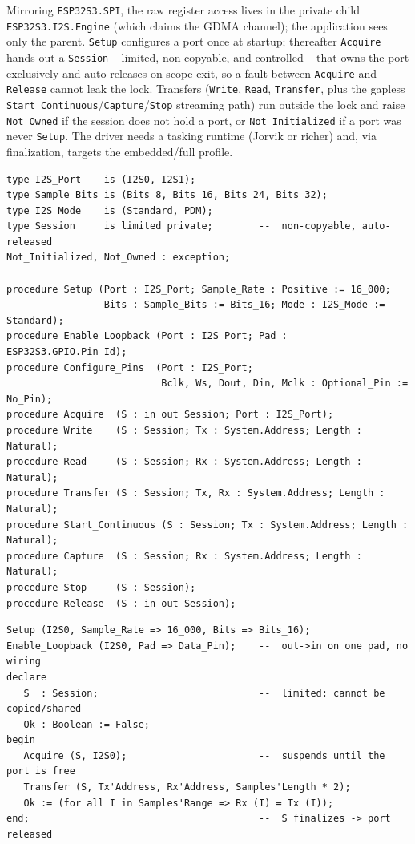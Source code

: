Mirroring \texttt{ESP32S3.SPI}, the raw register access lives in the private child
\texttt{ESP32S3.I2S.Engine} (which claims the GDMA channel); the application sees
only the parent. \texttt{Setup} configures a port once at startup; thereafter
\texttt{Acquire} hands out a \texttt{Session} -- limited, non-copyable, and
controlled -- that owns the port exclusively and auto-releases on scope exit, so a
fault between \texttt{Acquire} and \texttt{Release} cannot leak the lock.
Transfers (\texttt{Write}, \texttt{Read}, \texttt{Transfer}, plus the gapless
\texttt{Start\_Continuous}/\texttt{Capture}/\texttt{Stop} streaming path) run
outside the lock and raise \texttt{Not\_Owned} if the session does not hold a
port, or \texttt{Not\_Initialized} if a port was never \texttt{Setup}. The driver
needs a tasking runtime (Jorvik or richer) and, via finalization, targets the
embedded/full profile.

\begin{lstlisting}
type I2S_Port    is (I2S0, I2S1);
type Sample_Bits is (Bits_8, Bits_16, Bits_24, Bits_32);
type I2S_Mode    is (Standard, PDM);
type Session     is limited private;        --  non-copyable, auto-released
Not_Initialized, Not_Owned : exception;

procedure Setup (Port : I2S_Port; Sample_Rate : Positive := 16_000;
                 Bits : Sample_Bits := Bits_16; Mode : I2S_Mode := Standard);
procedure Enable_Loopback (Port : I2S_Port; Pad : ESP32S3.GPIO.Pin_Id);
procedure Configure_Pins  (Port : I2S_Port;
                           Bclk, Ws, Dout, Din, Mclk : Optional_Pin := No_Pin);
procedure Acquire  (S : in out Session; Port : I2S_Port);
procedure Write    (S : Session; Tx : System.Address; Length : Natural);
procedure Read     (S : Session; Rx : System.Address; Length : Natural);
procedure Transfer (S : Session; Tx, Rx : System.Address; Length : Natural);
procedure Start_Continuous (S : Session; Tx : System.Address; Length : Natural);
procedure Capture  (S : Session; Rx : System.Address; Length : Natural);
procedure Stop     (S : Session);
procedure Release  (S : in out Session);
\end{lstlisting}

\begin{lstlisting}
Setup (I2S0, Sample_Rate => 16_000, Bits => Bits_16);
Enable_Loopback (I2S0, Pad => Data_Pin);    --  out->in on one pad, no wiring
declare
   S  : Session;                            --  limited: cannot be copied/shared
   Ok : Boolean := False;
begin
   Acquire (S, I2S0);                       --  suspends until the port is free
   Transfer (S, Tx'Address, Rx'Address, Samples'Length * 2);
   Ok := (for all I in Samples'Range => Rx (I) = Tx (I));
end;                                        --  S finalizes -> port released
\end{lstlisting}

